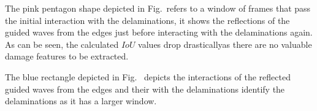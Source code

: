 The pink pentagon shape depicted in Fig.~\DIFdelbegin \DIFdel{\ref{fig:L3_S4_B_333x333p_50kHz_5HC_shapes_} }\DIFdelend \DIFaddbegin \DIFadd{\ref{fig:L3_S4_B_333x333p_50kHz_5HC_IoU_centre_window} }\DIFaddend refers to a window of frames that pass the initial interaction with the delaminations\DIFdelbegin {}\DIFdelend \DIFaddbegin {}\DIFaddend , it shows the reflections of the guided waves from the edges just before interacting with the delaminations again.
As can be seen, the calculated \(IoU\) values drop drastically\DIFdelbegin {}\DIFdelend \DIFaddbegin {}\DIFaddend as there are no valuable damage features to be extracted.  

The blue rectangle depicted in Fig.~\DIFdelbegin {}\DIFdelend \DIFaddbegin {}\DIFaddend {} \DIFdelbegin {}\DIFdelend \DIFaddbegin {}\DIFaddend depicts the interactions of the reflected guided waves from the edges and their \DIFdelbegin {}\DIFdelend \DIFaddbegin {}\DIFaddend with the delaminations\DIFdelbegin {}\DIFdelend \DIFaddbegin {}\DIFaddend {} \DIFdelbegin {}\DIFdelend \DIFaddbegin {}\DIFaddend identify the delaminations as it has a larger window.

